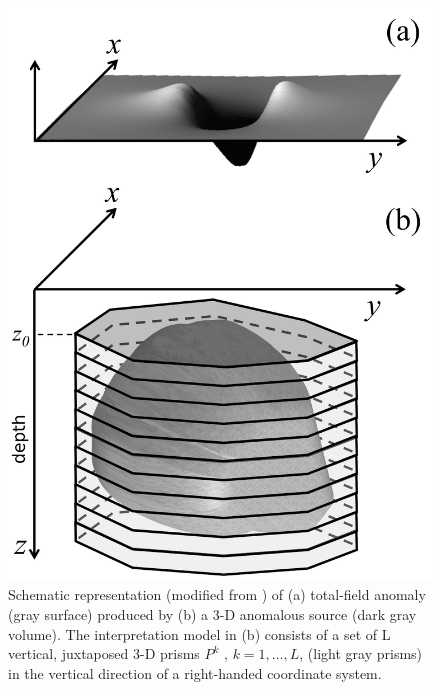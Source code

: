 
\begin{figure}
    \centering
    \includegraphics[scale=1]{figures/observed_data.png}
    \caption{Schematic representation (modified from \cite{oliveirajr-barbosa2013}) of (a) total-field anomaly (gray surface) produced by (b) a 3-D anomalous source (dark gray volume). The interpretation model in (b) consists of a set of L vertical, juxtaposed 3-D prisms $P^k$ , $k = 1,\dots, L$, (light gray prisms) in the vertical direction of a right-handed coordinate system.}
    \label{fig:obs}
\end{figure}

